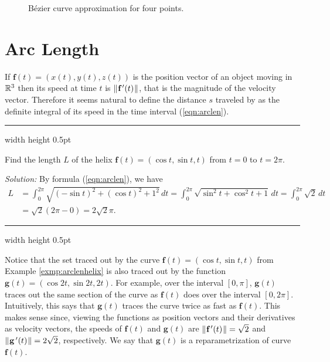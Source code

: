 \begin{figure}[h]
  \begin{center}
   
  \end{center}
 \caption[]{\quad B\'{e}zier curve approximation for four points.}
 \label{fig:bezier3}
 \end{figure}
 
\newpage
\section{Arc Length}

If $\textbf{f}(t) = (x(t),y(t),z(t))$ is the position vector of an object moving in $\mathbb{R}^{3}$ then 
its speed at time $t$ is $\lVert\mspace{1mu}\textbf{f}\,'(t)\mspace{1mu}\rVert$,
that is the magnitude  of the velocity vector.
Therefore it seems natural to define the distance $s$
traveled by as the definite integral of its speed in the time interval (\ref{eqn:arclen}).

\smallskip
\hrule width \textwidth height 0.5pt
\begin{exmp}\label{exmp:arclenhelix}
 Find the length $L$ of the helix $\textbf{f}(t) = ( \cos t , \sin t , t )$ from $t = 0$ to $t =
 2\pi$.
 \smallskip
 \par\noindent \emph{Solution:} 
 By formula (\ref{eqn:arclen}), we have
 \begin{align*}
  L &= \int_{0}^{2\pi} \sqrt{(-\sin t)^2 + (\cos t)^2 + 1^2}\,dt 
  = \int_{0}^{2\pi} \sqrt{\sin^2 t + \cos^2 t + 1}\,dt 
  = \int_{0}^{2\pi} \sqrt{2}\,dt\\
  &= \sqrt{2} (2\pi - 0) = 2\sqrt{2}\pi.
 \end{align*}
\end{exmp}
\hrule width \textwidth height 0.5pt
\smallskip

Notice that the set traced out by the curve $\textbf{f}(t) = (\cos t , \sin t , t)$ from Example
\ref{exmp:arclenhelix} is also traced out by the function $\textbf{g}(t) = (\cos 2t , \sin 2t , 2t)$.
For example, over the interval $[0,\pi]$, $\textbf{g}(t)$ traces out the same section of the curve as $\textbf{f}(t)$
does over the interval $[0,2\pi]$. Intuitively, this says that $\textbf{g}(t)$ traces the curve twice as fast as
$\textbf{f}(t)$. This makes sense since, viewing the functions as position vectors and their derivatives as velocity
vectors, the speeds of $\textbf{f}(t)$ and $\textbf{g}(t)$ are $\lVert\mspace{1mu}\textbf{f}\,'(t)\mspace{1mu}\rVert = \sqrt{2}$ and
$\lVert\mspace{1mu}\textbf{g}\,'(t)\mspace{1mu}\rVert = 2\sqrt{2}$, respectively. 
We say that $\textbf{g}(t)$ is a reparametrization of curve $\textbf{f}(t)$.

